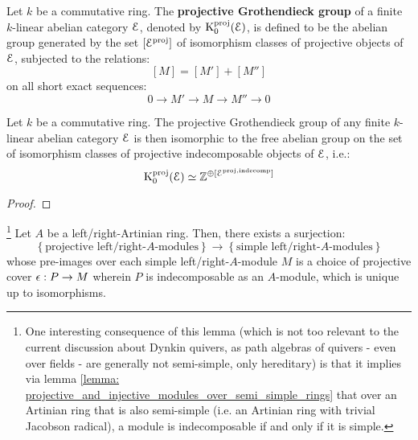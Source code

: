             \begin{definition} \label{def: projective_grothendieck_groups}
                Let $k$ be a commutative ring. The \textbf{projective Grothendieck group} of a finite $k$-linear abelian category $\mathcal{E}$, denoted by $\mathrm{K}_0^{\mathrm{proj}}(\mathcal{E})$, is defined to be the abelian group generated by the set $[\mathcal{E}^{\mathrm{proj}}]$ of isomorphism classes of projective objects of $\mathcal{E}$, subjected to the relations:
                    $$[M] = [M'] + [M'']$$
                on all short exact sequences:
                    $$0 \to M' \to M \to M'' \to 0$$
            \end{definition}
            \begin{proposition} \label{prop: projective_grothendieck_groups_are_free_on_projecitve_indecomposable_objects}
                Let $k$ be a commutative ring. The projective Grothendieck group of any finite $k$-linear abelian category $\mathcal{E}$ is then isomorphic to the free abelian group on the set of isomorphism classes of projective indecomposable objects of $\mathcal{E}$, i.e.:
                    $$\mathrm{K}_0^{\mathrm{proj}}(\mathcal{E}) \simeq \mathbb{Z}^{\oplus [\mathcal{E}^{\mathrm{proj}, \mathrm{indecomp}}]}$$
            \end{proposition}
                \begin{proof}
                    
                \end{proof}
            \begin{lemma} \label{lemma: projective_indecomposable_modules_over_artinian_algebras_are_simple}
                \footnote{One interesting consequence of this lemma (which is not too relevant to the current discussion about Dynkin quivers, as path algebras of quivers - even over fields - are generally not semi-simple, only hereditary) is that it implies via lemma \ref{lemma: projective_and_injective_modules_over_semi_simple_rings} that over an Artinian ring that is also semi-simple (i.e. an Artinian ring with trivial Jacobson radical), a module is indecomposable if and only if it is simple.} Let $A$ be a left/right-Artinian ring. Then, there exists a surjection:
                    $$
                        \left\{\text{projective left/right-$A$-modules}\right\}
                        \to
                        \left\{\text{simple left/right-$A$-modules}\right\}
                    $$
                whose pre-images over each simple left/right-$A$-module $M$ is a choice of projective cover $\epsilon: P \to M$ wherein $P$ is indecomposable as an $A$-module, which is unique up to isomorphisms. 
            \end{lemma}
